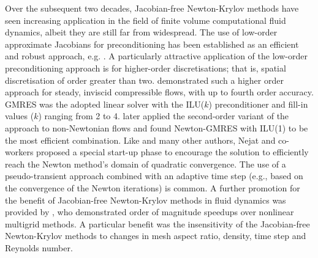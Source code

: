 \documentclass[sn-mathphys,Numbered]{sn-jnl}%
\begin{document}
Over the subsequent two decades, Jacobian-free Newton-Krylov methods have seen increasing application in the field of finite volume computational fluid dynamics, albeit they are still far from widespread.
The use of low-order approximate Jacobians for preconditioning has been established as an efficient and robust approach, e.g. \citep{Nejat2008, Vaassen2008, Nejat2011, Nishikawa2020}.
A particularly attractive application of the low-order preconditioning approach is for higher-order discretisations; that is, spatial discretisation of order greater than two.
\citet{Nejat2008} demonstrated such a higher order approach for steady, inviscid compressible flows, with up to fourth order accuracy.
GMRES was the adopted linear solver with the ILU($k$) preconditioner and fill-in values ($k$) ranging from 2 to 4. 
\citet{Nejat2011} later applied the second-order variant of the approach to non-Newtonian flows and found Newton-GMRES with ILU(1) to be the most efficient combination.
Like \citet{Vaassen2008} and many other authors, Nejat and co-workers \citep{Nejat2008, Nejat2011} proposed a special start-up phase to encourage the solution to efficiently reach the Newton method's domain of quadratic convergence.
The use of a pseudo-transient approach combined with an adaptive time step (e.g., based on the convergence of the Newton iterations) is common.
A further promotion for the benefit of Jacobian-free Newton-Krylov methods in fluid dynamics was provided by \citet{Lucas2010}, who demonstrated order of magnitude speedups over nonlinear multigrid methods.
A particular benefit was the insensitivity of the Jacobian-free Newton-Krylov methods to changes in mesh aspect ratio, density, time step and Reynolds number.
\end{document}
